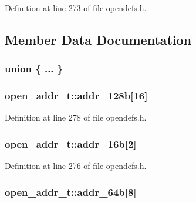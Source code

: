 Definition at line 273 of file opendefs.\+h.



\subsection{Member Data Documentation}
\subsubsection[{\texorpdfstring{"@152}{@152}}]{\setlength{\rightskip}{0pt plus 5cm}union \{ ... \} }\hypertarget{structopen__addr__t_acca0e1916a3cd36bca32a1a8919f4c18}{}\label{structopen__addr__t_acca0e1916a3cd36bca32a1a8919f4c18}
\subsubsection[{\texorpdfstring{addr\+\_\+128b}{addr_128b}}]{ open\+\_\+addr\+\_\+t\+::addr\+\_\+128b\mbox{[}16\mbox{]}}\hypertarget{structopen__addr__t_aa63d537d10bdd6d1a50a6d302a5e1817}{}\label{structopen__addr__t_aa63d537d10bdd6d1a50a6d302a5e1817}


Definition at line 278 of file opendefs.\+h.

\subsubsection[{\texorpdfstring{addr\+\_\+16b}{addr_16b}}]{ open\+\_\+addr\+\_\+t\+::addr\+\_\+16b\mbox{[}2\mbox{]}}\hypertarget{structopen__addr__t_afa50fc2bde5b1261a09666c75aeecc55}{}\label{structopen__addr__t_afa50fc2bde5b1261a09666c75aeecc55}


Definition at line 276 of file opendefs.\+h.

\subsubsection[{\texorpdfstring{addr\+\_\+64b}{addr_64b}}]{ open\+\_\+addr\+\_\+t\+::addr\+\_\+64b\mbox{[}8\mbox{]}}\hypertarget{structopen__addr__t_a7ca9b0c966447d191c6f05e375571231}{}\label{structopen__addr__t_a7ca9b0c966447d191c6f05e375571231}


